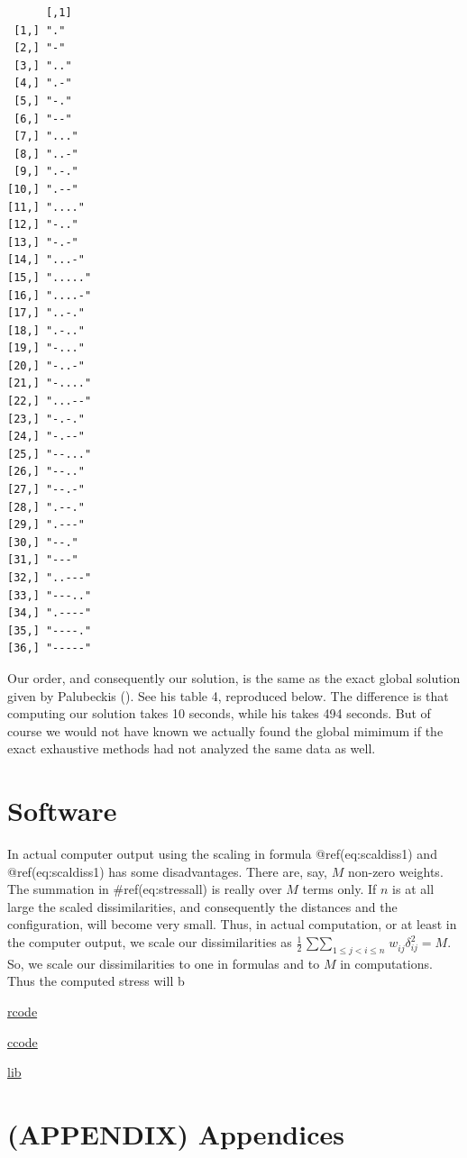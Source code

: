 \documentclass[
  12pt,
  letterpaper,
  DIV=11,
  numbers=noendperiod]{scrreprt}
\theoremstyle{remark}
\begin{document}
\begin{verbatim}
      [,1]   
 [1,] "."    
 [2,] "-"    
 [3,] ".."   
 [4,] ".-"   
 [5,] "-."   
 [6,] "--"   
 [7,] "..."  
 [8,] "..-"  
 [9,] ".-."  
[10,] ".--"  
[11,] "...." 
[12,] "-.."  
[13,] "-.-"  
[14,] "...-" 
[15,] "....."
[16,] "....-"
[17,] "..-." 
[18,] ".-.." 
[19,] "-..." 
[20,] "-..-" 
[21,] "-...."
[22,] "...--"
[23,] "-.-." 
[24,] "-.--" 
[25,] "--..."
[26,] "--.." 
[27,] "--.-" 
[28,] ".--." 
[29,] ".---" 
[30,] "--."  
[31,] "---"  
[32,] "..---"
[33,] "---.."
[34,] ".----"
[35,] "----."
[36,] "-----"
\end{verbatim}

Our order, and consequently our solution, is the same as the exact
global solution given by Palubeckis
(). See his table 4, reproduced below.
The difference is that computing our solution takes 10 seconds, while
his takes 494 seconds. But of course we would not have known we actually
found the global mimimum if the exact exhaustive methods had not
analyzed the same data as well.


\chapter{Software}\label{chsoftware}

In actual computer output using the scaling in formula
@ref(eq:scaldiss1) and @ref(eq:scaldiss1) has some disadvantages. There
are, say, \(M\) non-zero weights. The summation in \#ref(eq:stressall)
is really over \(M\) terms only. If \(n\) is at all large the scaled
dissimilarities, and consequently the distances and the configuration,
will become very small. Thus, in actual computation, or at least in the
computer output, we scale our dissimilarities as
\(\frac12\mathop{\sum\sum}_{1\leq j<i\leq n} w_{ij}^{\ }\delta_{ij}^2=M\).
So, we scale our dissimilarities to one in formulas and to \(M\) in
computations. Thus the computed stress will b

\href{https://github.com/deleeuw/stress/tree/main/rcode/}{rcode}

\href{https://github.com/deleeuw/stress/tree/main/ccode/}{ccode}

\href{https://github.com/deleeuw/stress/tree/main/lib/}{lib}


\chapter*{(APPENDIX) Appendices}\label{appendix-appendices}
\end{document}
